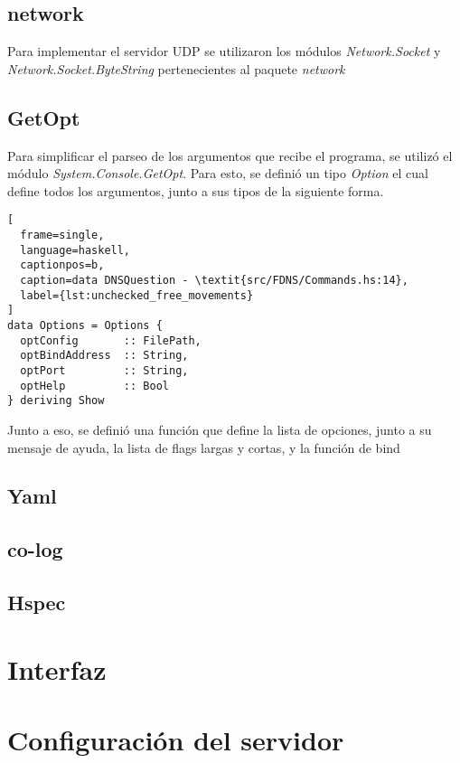 \documentclass{article}
\begin{document}
\subsection{network \cite{package-network-socket}}

Para implementar el servidor UDP se utilizaron los módulos \textit{Network.Socket}
y \textit{Network.Socket.ByteString} pertenecientes al paquete \textit{network}

\subsection{GetOpt \cite{package-get-opt}}

Para simplificar el parseo de los argumentos que recibe el programa, se utilizó
el módulo \textit{System.Console.GetOpt}. Para esto, se definió un tipo
\textit{Option} el cual define todos los argumentos, junto a sus tipos de la
siguiente forma.

\begin{lstlisting}[
  frame=single,
  language=haskell,
  captionpos=b,
  caption=data DNSQuestion - \textit{src/FDNS/Commands.hs:14},
  label={lst:unchecked_free_movements}
]
data Options = Options {
  optConfig       :: FilePath,
  optBindAddress  :: String,
  optPort         :: String,
  optHelp         :: Bool
} deriving Show
\end{lstlisting}

Junto a eso, se definió una función que define la lista de opciones, junto a su
mensaje de ayuda, la lista de flags largas y cortas, y la función de bind

\subsection{Yaml \cite{package-yaml}}
\subsection{co-log \cite{package-co-log}}
\subsection{Hspec \cite{package-hspec}}

\section{Interfaz}

\section{Configuración del servidor}

\clearpage
\renewcommand\refname{Referencias}


\end{document}
